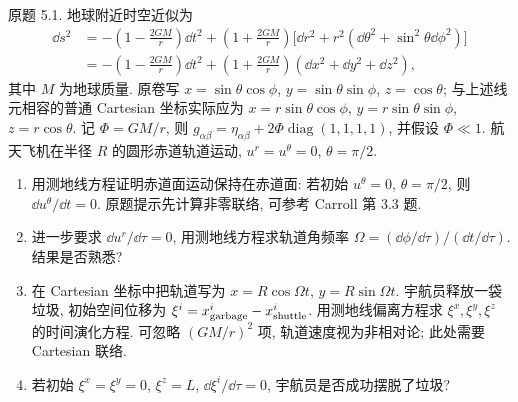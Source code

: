 \begin{exercise}
原题 5.1. 地球附近时空近似为
\begin{align*}
\dd s^2&=-\left(1-\frac{2GM}r\right)\dd t^2
+\left(1+\frac{2GM}r\right)
\bigl[\dd r^2+r^2(\dd\theta^2+\sin^2\theta\dd\phi^2)\bigr]\\
&=-\left(1-\frac{2GM}r\right)\dd t^2
+\left(1+\frac{2GM}r\right)(\dd x^2+\dd y^2+\dd z^2),
\end{align*}
其中 $M$ 为地球质量. 原卷写 $x=\sin\theta\cos\phi$, $y=\sin\theta\sin\phi$, $z=\cos\theta$; 与上述线元相容的普通 Cartesian 坐标实际应为 $x=r\sin\theta\cos\phi$, $y=r\sin\theta\sin\phi$, $z=r\cos\theta$. 记 $\Phi=GM/r$, 则 $g_{\alpha\beta}=\eta_{\alpha\beta}+2\Phi\operatorname{diag}(1,1,1,1)$, 并假设 $\Phi\ll1$. 航天飞机在半径 $R$ 的圆形赤道轨道运动, $u^r=u^\theta=0$, $\theta=\pi/2$.
\begin{enumerate}[label=(\alph*)]
\item 用测地线方程证明赤道面运动保持在赤道面: 若初始 $u^\theta=0$, $\theta=\pi/2$, 则 $\dd u^\theta/\dd t=0$. 原题提示先计算非零联络, 可参考 Carroll 第 3.3 题.
\item 进一步要求 $\dd u^r/\dd\tau=0$, 用测地线方程求轨道角频率 $\Omega=(\dd\phi/\dd\tau)/(\dd t/\dd\tau)$. 结果是否熟悉?
\item 在 Cartesian 坐标中把轨道写为 $x=R\cos\Omega t$, $y=R\sin\Omega t$. 宇航员释放一袋垃圾, 初始空间位移为 $\mathord{\xi^i=x^i_{\rm garbage}-x^i_{\rm shuttle}}$. 用测地线偏离方程求 $\xi^x,\xi^y,\xi^z$ 的时间演化方程. 可忽略 $(GM/r)^2$ 项, 轨道速度视为非相对论; 此处需要 Cartesian 联络.
\item 若初始 $\xi^x=\xi^y=0$, $\xi^z=L$, $\dd\xi^i/\dd\tau=0$, 宇航员是否成功摆脱了垃圾?
\end{enumerate}
\end{exercise}
